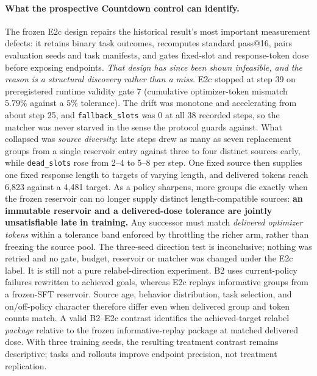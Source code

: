 \paragraph{What the prospective Countdown control can identify.}
The frozen E2c design repairs the historical result's most important
measurement defects: it retains binary task outcomes, recomputes
standard pass@16, pairs evaluation seeds and task manifests, and gates
fixed-slot and response-token dose before exposing endpoints. \emph{That
design has since been shown infeasible, and the reason is a structural
discovery rather than a miss.} E2c stopped at step 39 on preregistered runtime
validity gate 7 (cumulative optimizer-token mismatch $5.79\%$ against a $5\%$
tolerance). The drift was monotone and accelerating from about step 25, and
\texttt{fallback\_slots} was $0$ at all 38 recorded steps, so the matcher was
never starved in the sense the protocol guards against. What collapsed was
\emph{source diversity}: late steps drew as many as seven replacement groups
from a single reservoir entry against three to four distinct sources early,
while \texttt{dead\_slots} rose from 2--4 to 5--8 per step. One fixed source
then supplies one fixed response length to targets of varying length, and
delivered tokens reach 6{,}823 against a 4{,}481 target. As a policy sharpens,
more groups die exactly when the frozen reservoir can no longer supply distinct
length-compatible sources: \textbf{an immutable reservoir and a delivered-dose
tolerance are jointly unsatisfiable late in training.} Any successor must match
\emph{delivered optimizer tokens} within a tolerance band enforced by
throttling the richer arm, rather than freezing the source pool. The three-seed
direction test is inconclusive; nothing was retried and no gate, budget,
reservoir or matcher was changed under the E2c label. It is
still not a pure relabel-direction experiment. B2 uses current-policy
failures rewritten to achieved goals, whereas E2c replays informative
groups from a frozen-SFT reservoir. Source age, behavior distribution,
task selection, and on/off-policy character therefore differ even when
delivered group and token counts match. A valid B2--E2c contrast
identifies the achieved-target relabel \emph{package} relative to the
frozen informative-replay package at matched delivered dose. With three
training seeds, the resulting treatment contrast remains descriptive;
tasks and rollouts improve endpoint precision, not treatment
replication.

